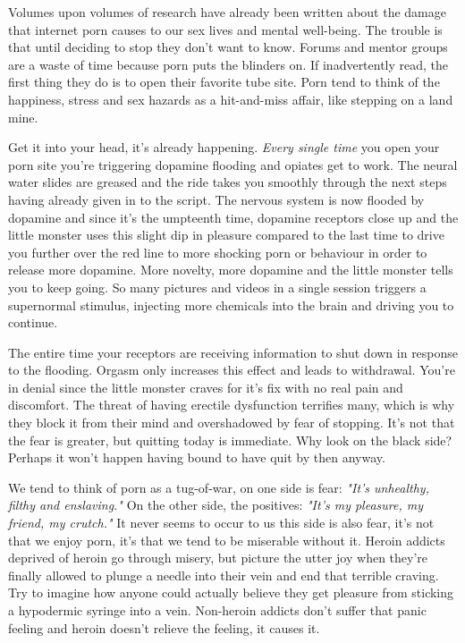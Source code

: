 \documentclass[easypeasy.tex]{subfiles}
\begin{document}
Volumes upon volumes of research have already been written about the damage that internet porn causes to our sex lives and mental well-being. The trouble is that until deciding to stop they don't want to know. Forums and mentor groups are a waste of time because porn puts the blinders on. If inadvertently read, the first thing they do is to open their favorite tube site. Porn tend to think of the happiness, stress and sex hazards as a hit-and-miss affair, like stepping on a land mine.

Get it into your head, it's already happening. \textit{Every single time} you open your porn site you're triggering dopamine flooding and opiates get to work. The neural water slides are greased and the ride takes you smoothly through the next steps having already given in to the script. The nervous system is now flooded by dopamine and since it's the umpteenth time, dopamine receptors close up and the little monster uses this slight dip in pleasure compared to the last time to drive you further over the red line to more shocking porn or behaviour in order to release more dopamine. More novelty, more dopamine and the little monster tells you to keep going. So many pictures and videos in a single session triggers a supernormal stimulus, injecting more chemicals into the brain and driving you to continue.

The entire time your receptors are receiving information to shut down in response to the flooding. Orgasm only increases this effect and leads to withdrawal. You're in denial since the little monster craves for it's fix with no real pain and discomfort. The threat of having erectile dysfunction terrifies many, which is why they block it from their mind and overshadowed by fear of stopping. It's not that the fear is greater, but quitting today is immediate. Why look on the black side? Perhaps it won't happen having bound to have quit by then anyway.

We tend to think of porn as a tug-of-war, on one side is fear: \textit{"It's unhealthy, filthy and enslaving."} On the other side, the positives: \textit{"It's my pleasure, my friend, my crutch."} It never seems to occur to us this side is also fear, it's not that we enjoy porn, it's that we tend to be miserable without it. Heroin addicts deprived of heroin go through misery, but picture the utter joy when they're finally allowed to plunge a needle into their vein and end that terrible craving. Try to imagine how anyone could actually believe they get pleasure from sticking a hypodermic syringe into a vein. Non-heroin addicts don't suffer that panic feeling and heroin doesn't relieve the feeling, it causes it.
\end{document}
